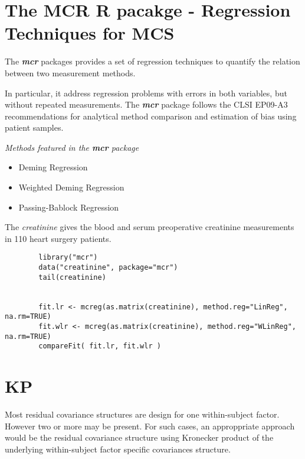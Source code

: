 \documentclass[MAIN.tex]{subfiles}
\begin{document}
	\section{The MCR R pacakge - Regression Techniques for MCS}
	
	The \textbf{\textit{mcr}} packages provides a set of regression techniques to quantify the relation between two measurement methods.
	
	In particular, it address regression problems with errors in both variables, but without repeated measurements.
	The \textbf{\textit{mcr}} package follows the CLSI EP09-A3 recommendations for analytical
	method comparison and estimation of bias using patient samples.
	
	
	\textit{Methods featured in the \textbf{mcr} package}
	
	\begin{itemize}
		\item Deming Regression
		\item Weighted Deming Regression
		\item Passing-Bablock Regression
	\end{itemize}
	
	The \textit{creatinine} gives the blood and serum preoperative creatinine measurements in 110 heart surgery patients.
	
	\begin{framed}
		\begin{verbatim}
		library("mcr")
		data("creatinine", package="mcr")
		tail(creatinine)
		
		
		fit.lr <- mcreg(as.matrix(creatinine), method.reg="LinReg", na.rm=TRUE)
		fit.wlr <- mcreg(as.matrix(creatinine), method.reg="WLinReg", na.rm=TRUE)
		compareFit( fit.lr, fit.wlr )
		\end{verbatim}
	\end{framed}
	
	

	\section{KP}
	Most residual covariance structures are design for one
	within-subject factor. However two or more may be present. For
	such cases, an approppriate approach would be the residual
	covariance structure using Kronecker product of the underlying
	within-subject factor specific covariances structure.
	
\end{document}
